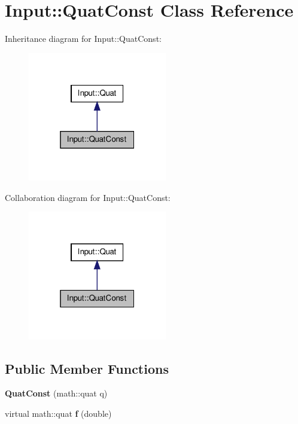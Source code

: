 \hypertarget{classInput_1_1QuatConst}{\section{\-Input\-:\-:\-Quat\-Const \-Class \-Reference}
\label{classInput_1_1QuatConst}
}


\-Inheritance diagram for \-Input\-:\-:\-Quat\-Const\-:\nopagebreak
\begin{figure}[H]
\begin{center}
\leavevmode
\includegraphics[width=172pt]{classInput_1_1QuatConst__inherit__graph}
\end{center}
\end{figure}


\-Collaboration diagram for \-Input\-:\-:\-Quat\-Const\-:\nopagebreak
\begin{figure}[H]
\begin{center}
\leavevmode
\includegraphics[width=172pt]{classInput_1_1QuatConst__coll__graph}
\end{center}
\end{figure}
\subsection*{\-Public \-Member \-Functions}
\begin{DoxyCompactItemize}
\item 
\hypertarget{classInput_1_1QuatConst_a553b37a3fc9003b0b6eb9d65cb744c66}{{\bfseries \-Quat\-Const} (math\-::quat q)}\label{classInput_1_1QuatConst_a553b37a3fc9003b0b6eb9d65cb744c66}

\item 
\hypertarget{classInput_1_1QuatConst_a94f713bd2ccccdeaa2c2f93ce17db391}{virtual math\-::quat {\bfseries f} (double)}\label{classInput_1_1QuatConst_a94f713bd2ccccdeaa2c2f93ce17db391}

\end{DoxyCompactItemize}
